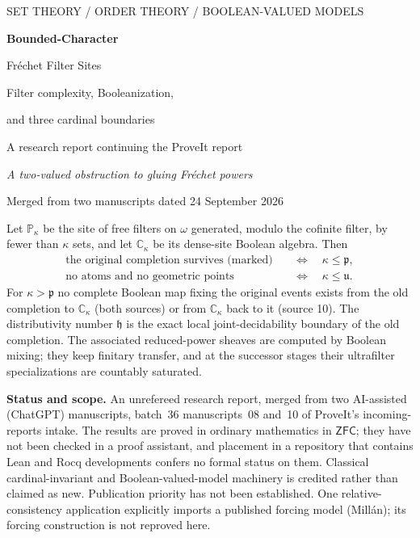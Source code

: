 \documentclass[11pt,letterpaper]{article}
\theoremstyle{definition}
\theoremstyle{remark}
\newcommand{\om}{\omega}
\newcommand{\C}{\mathbb C}
\newcommand{\PP}{\mathbb P}
\newcommand{\cp}{\mathfrak p}
\newcommand{\cu}{\mathfrak u}
\newcommand{\ch}{\mathfrak h}
\newcommand{\ZFC}{\mathsf{ZFC}}
\begin{document}
\hypersetup{pageanchor=false}
\begin{titlepage}
\thispagestyle{empty}
\vspace*{0.2in}
{\large\sffamily\color{accent}SET THEORY / ORDER THEORY / BOOLEAN-VALUED MODELS\par}
\vspace{0.3in}
{\Huge\bfseries Bounded-Character\par Fr\'echet Filter Sites\par}
\vspace{0.18in}
{\LARGE\color{muted}Filter complexity, Booleanization,\par and three cardinal boundaries\par}
\vspace{0.3in}
{\large A research report continuing the ProveIt report\par
\emph{A two-valued obstruction to gluing Fr\'echet powers}\par}
\vspace{0.1in}
{\large Merged from two manuscripts dated 24 September 2026\par}
\vspace{0.25in}
\begin{resultbox}
Let $\PP_\kappa$ be the site of free filters on $\om$ generated, modulo
the cofinite filter, by fewer than $\kappa$ sets, and let $\C_\kappa$ be
its dense-site Boolean algebra. Then
\[
 \begin{aligned}
 \text{the original completion survives (marked)}&\quad\Longleftrightarrow\quad\kappa\leq\cp,\\
 \text{no atoms and no geometric points}&\quad\Longleftrightarrow\quad\kappa\leq\cu.
 \end{aligned}
\]
For $\kappa>\cp$ no complete Boolean map fixing the original events
exists from the old completion to $\C_\kappa$ (both sources) or from
$\C_\kappa$ back to it (source 10). The distributivity number $\ch$ is
the exact local joint-decidability boundary of the old completion. The
associated reduced-power sheaves are computed by Boolean mixing; they
keep finitary transfer, and at the successor stages their ultrafilter
specializations are countably saturated.
\end{resultbox}
\vfill
\noindent\textbf{Status and scope.} An unrefereed research report,
merged from two AI-assisted (ChatGPT) manuscripts, batch~36
manuscripts~08 and~10 of ProveIt's incoming-reports intake. The results
are proved in ordinary mathematics in $\ZFC$; they have not been checked
in a proof assistant, and placement in a repository that contains Lean
and Rocq developments confers no formal status on them. Classical
cardinal-invariant and Boolean-valued-model machinery is credited rather
than claimed as new. Publication priority has not been established.
One relative-consistency application explicitly imports a published
forcing model (Mill\'an); its forcing construction is not reproved here.
\end{titlepage}
\hypersetup{pageanchor=true}
\end{document}
